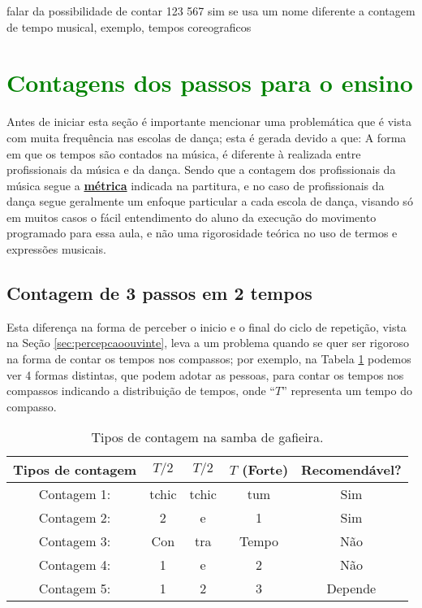falar da possibilidade de contar 123 567 sim se usa um nome diferente a contagem de tempo musical,
exemplo, tempos coreograficos



\section{\textcolor{green}{Contagens dos passos para o ensino}}
Antes de iniciar esta seção é importante mencionar uma
problemática que é vista com muita frequência nas escolas de dança; 
esta é gerada devido a que: A forma em que os tempos são contados 
na música, é
diferente à realizada entre profissionais da música e da dança. 
Sendo que a contagem dos profissionais da música segue a \hyperref[def:Metrica]{\textbf{métrica}} indicada na partitura,
e no caso de profissionais da dança segue geralmente um enfoque 
particular a cada escola de dança, visando só em muitos casos o fácil entendimento do aluno da
execução do movimento programado para essa aula, e não uma rigorosidade teórica no uso de termos e 
expressões musicais.




\subsection{Contagem de 3 passos em 2 tempos}
Esta diferença na forma de perceber o inicio e o final do ciclo de repetição,
vista na Seção \ref{sec:percepcaoouvinte}, 
leva a um problema quando se quer ser rigoroso na forma de contar os tempos nos compassos; 
por exemplo, na Tabela \ref{tab:ritmo1} 
podemos ver 4 formas distintas, que podem adotar as pessoas, 
para contar os tempos nos compassos indicando a distribuição de tempos, 
onde ``$T$'' representa um tempo do compasso.
\begin{table}[ht]
  \centering
  \begin{tabular}    {c|ccc|c}
    \hline
    Tipos de contagem       & $T/2$ & $T/2$   & $T$ (Forte) & Recomendável?\\
    \hline
    Contagem 1: & tchic  & tchic  & tum   & Sim\\
    Contagem 2: & 2     & e     & 1     & Sim\\ \hline
    Contagem 3: & Con   & tra  & Tempo & Não\\
    Contagem 4: & 1     & e     & 2     & Não\\  \hline
    Contagem 5: & 1     & 2     & 3     & Depende\\ \hline
    \hline
  \end{tabular}
  \caption{Tipos de contagem na samba de gafieira.}
\label{tab:ritmo1}
\end{table}

